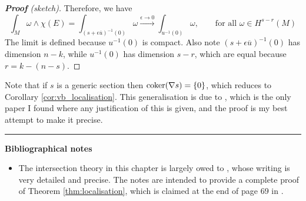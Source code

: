 \begin{proof}[\textbf{\textit{Proof}} (sketch)]
	Therefore, we have 
	\[
	\int_{M} \omega \wedge \chi(E) 
	= \int_{(s+\epsilon \overline{u})^{-1}(0)} \omega
	\xrightarrow{\epsilon \to 0} 
	\int_{u^{-1}(0)} \omega, \qquad
	\text{for all } \omega\in H^{s-r}(M)
	\]
	The limit is defined because $u^{-1}(0)$ is compact. 
	Also note $(s+\epsilon \overline{u})^{-1}(0)$ has dimension $n-k$, while 
	$u^{-1}(0)$ has dimension $s-r$, which are equal because
	$r = k-(n-s)$. 

\end{proof}

Note that if $s$ is a generic section then  $\operatorname{coker} (\nabla s) = \{0\}$, which
reduces to Corollary \ref{cor:vb_localisation}. This generalisation is due to
\citet[Sec 3.3]{witten_coker}, which is the only paper I found where any 
justification of this is given, and the proof is my best attempt to make it
precise.  
 

\vspace{5mm}
\hrule 
\vspace{5mm}

\textbf{Bibliographical notes}
{\small
\begin{itemize}
	\item The intersection theory in this chapter is largely owed to
	\citet{nicolaescu_intersection}, whose writing is very detailed and
	precise. The notes are intended to provide a complete proof of Theorem
	\ref{thm:localisation}, which is claimed at the end of page 69 in 
	\citet{bott_tu}.
\end{itemize}
}
